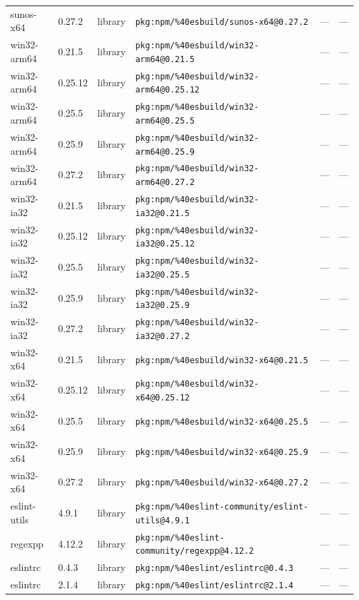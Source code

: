 \documentclass[11pt]{article}
\begin{document}
\begin{longtable}{|l|l|l|p{2.2cm}|l|p{4cm}|}
sunos-x64 & 0.27.2 & library & \texttt{pkg:npm/\%40esbuild/sunos-x64@0.27.2} & — & — \\
win32-arm64 & 0.21.5 & library & \texttt{pkg:npm/\%40esbuild/win32-arm64@0.21.5} & — & — \\
win32-arm64 & 0.25.12 & library & \texttt{pkg:npm/\%40esbuild/win32-arm64@0.25.12} & — & — \\
win32-arm64 & 0.25.5 & library & \texttt{pkg:npm/\%40esbuild/win32-arm64@0.25.5} & — & — \\
win32-arm64 & 0.25.9 & library & \texttt{pkg:npm/\%40esbuild/win32-arm64@0.25.9} & — & — \\
win32-arm64 & 0.27.2 & library & \texttt{pkg:npm/\%40esbuild/win32-arm64@0.27.2} & — & — \\
win32-ia32 & 0.21.5 & library & \texttt{pkg:npm/\%40esbuild/win32-ia32@0.21.5} & — & — \\
win32-ia32 & 0.25.12 & library & \texttt{pkg:npm/\%40esbuild/win32-ia32@0.25.12} & — & — \\
win32-ia32 & 0.25.5 & library & \texttt{pkg:npm/\%40esbuild/win32-ia32@0.25.5} & — & — \\
win32-ia32 & 0.25.9 & library & \texttt{pkg:npm/\%40esbuild/win32-ia32@0.25.9} & — & — \\
win32-ia32 & 0.27.2 & library & \texttt{pkg:npm/\%40esbuild/win32-ia32@0.27.2} & — & — \\
win32-x64 & 0.21.5 & library & \texttt{pkg:npm/\%40esbuild/win32-x64@0.21.5} & — & — \\
win32-x64 & 0.25.12 & library & \texttt{pkg:npm/\%40esbuild/win32-x64@0.25.12} & — & — \\
win32-x64 & 0.25.5 & library & \texttt{pkg:npm/\%40esbuild/win32-x64@0.25.5} & — & — \\
win32-x64 & 0.25.9 & library & \texttt{pkg:npm/\%40esbuild/win32-x64@0.25.9} & — & — \\
win32-x64 & 0.27.2 & library & \texttt{pkg:npm/\%40esbuild/win32-x64@0.27.2} & — & — \\
eslint-utils & 4.9.1 & library & \texttt{pkg:npm/\%40eslint-community/eslint-utils@4.9.1} & — & — \\
regexpp & 4.12.2 & library & \texttt{pkg:npm/\%40eslint-community/regexpp@4.12.2} & — & — \\
eslintrc & 0.4.3 & library & \texttt{pkg:npm/\%40eslint/eslintrc@0.4.3} & — & — \\
eslintrc & 2.1.4 & library & \texttt{pkg:npm/\%40eslint/eslintrc@2.1.4} & — & — \\

\end{longtable}
\end{document}
